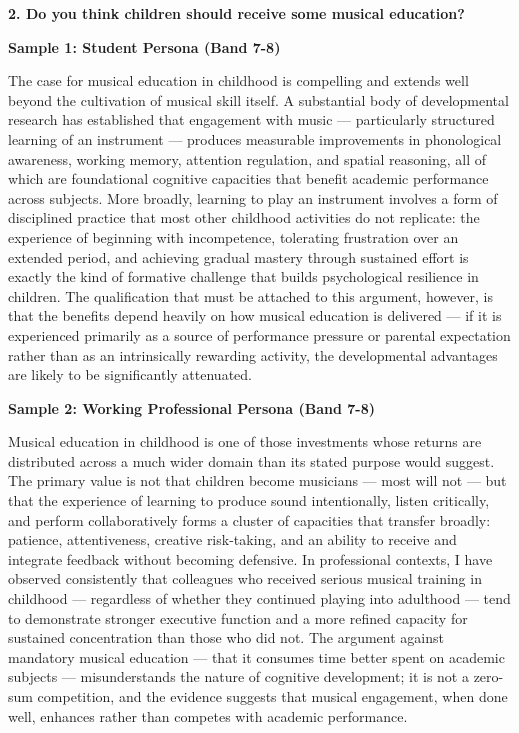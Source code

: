 \separator

\begin{ieltsquestion}
\textbf{2. Do you think children should receive some musical education?}
\end{ieltsquestion}
\textbf{Sample 1: Student Persona (Band 7-8)}

The case for musical education in childhood is compelling and extends well beyond the cultivation of musical skill itself. A substantial body of developmental research has established that engagement with music — particularly structured learning of an instrument — produces measurable improvements in phonological awareness, working memory, attention regulation, and spatial reasoning, all of which are foundational cognitive capacities that benefit academic performance across subjects. More broadly, learning to play an instrument involves a form of disciplined practice that most other childhood activities do not replicate: the experience of beginning with incompetence, tolerating frustration over an extended period, and achieving gradual mastery through sustained effort is exactly the kind of formative challenge that builds psychological resilience in children. The qualification that must be attached to this argument, however, is that the benefits depend heavily on how musical education is delivered — if it is experienced primarily as a source of performance pressure or parental expectation rather than as an intrinsically rewarding activity, the developmental advantages are likely to be significantly attenuated.

\textbf{Sample 2: Working Professional Persona (Band 7-8)}

Musical education in childhood is one of those investments whose returns are distributed across a much wider domain than its stated purpose would suggest. The primary value is not that children become musicians — most will not — but that the experience of learning to produce sound intentionally, listen critically, and perform collaboratively forms a cluster of capacities that transfer broadly: patience, attentiveness, creative risk-taking, and an ability to receive and integrate feedback without becoming defensive. In professional contexts, I have observed consistently that colleagues who received serious musical training in childhood — regardless of whether they continued playing into adulthood — tend to demonstrate stronger executive function and a more refined capacity for sustained concentration than those who did not. The argument against mandatory musical education — that it consumes time better spent on academic subjects — misunderstands the nature of cognitive development; it is not a zero-sum competition, and the evidence suggests that musical engagement, when done well, enhances rather than competes with academic performance.

